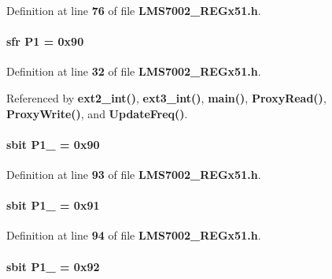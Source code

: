 Definition at line {\bf 76} of file {\bf L\+M\+S7002\+\_\+\+R\+E\+Gx51.\+h}.

\paragraph[{P1}]{\setlength{\rightskip}{0pt plus 5cm}sfr P1 = 0x90}\label{LMS7002__REGx51_8h_a064e921a8b02f66fd1e90b6b36298773}


Definition at line {\bf 32} of file {\bf L\+M\+S7002\+\_\+\+R\+E\+Gx51.\+h}.



Referenced by {\bf ext2\+\_\+int()}, {\bf ext3\+\_\+int()}, {\bf main()}, {\bf Proxy\+Read()}, {\bf Proxy\+Write()}, and {\bf Update\+Freq()}.

\paragraph[{P1\+\_\+0}]{\setlength{\rightskip}{0pt plus 5cm}sbit P1\+\_ = 0x90}\label{LMS7002__REGx51_8h_a854a536014975938a959feb9f2a4f00e}


Definition at line {\bf 93} of file {\bf L\+M\+S7002\+\_\+\+R\+E\+Gx51.\+h}.

\paragraph[{P1\+\_\+1}]{\setlength{\rightskip}{0pt plus 5cm}sbit P1\+\_ = 0x91}\label{LMS7002__REGx51_8h_ab1fa8981c3ea2ee5fc9894c97d4c17b4}


Definition at line {\bf 94} of file {\bf L\+M\+S7002\+\_\+\+R\+E\+Gx51.\+h}.

\paragraph[{P1\+\_\+2}]{\setlength{\rightskip}{0pt plus 5cm}sbit P1\+\_ = 0x92}\label{LMS7002__REGx51_8h_a0642bb738418fae6aecb08c1b592afc5}


